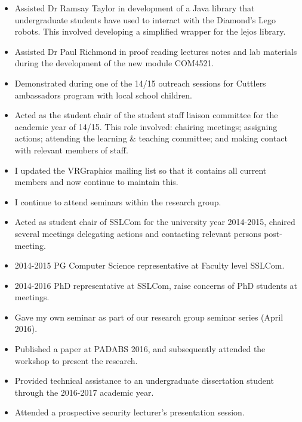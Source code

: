 \begin{itemize}
  \item Assisted Dr Ramsay Taylor in development of a Java library that undergraduate students have used to interact with the Diamond's Lego robots. This involved developing a simplified wrapper for the lejos library.
  \item Assisted Dr Paul Richmond in proof reading lectures notes and lab materials during the development of the new module COM4521.
  \item Demonstrated during one of the 14/15 outreach sessions for Cuttlers ambassadors program with local school children.
  \item Acted as the student chair of the student staff liaison committee for the academic year of 14/15. This role involved: chairing meetings; assigning actions; attending the learning \& teaching committee; and making contact with relevant members of staff.
  \item I updated the VRGraphics mailing list so that it contains all current members and now continue to maintain this.
  \item I continue to attend seminars within the research group.
  \item Acted as student chair of SSLCom for the university year 2014-2015, chaired several meetings delegating actions and contacting relevant persons post-meeting.
  \item 2014-2015 PG Computer Science representative at Faculty level SSLCom.
  \item 2014-2016 PhD representative at SSLCom, raise concerns of PhD students at meetings.
  \item Gave my own seminar as part of our research group seminar series (April 2016).
  \item Published a paper at PADABS 2016, and subsequently attended the workshop to present the research.
  \item Provided technical assistance to an undergraduate dissertation student through the 2016-2017 academic year.
  \item Attended a prospective security lecturer's presentation session.  
\end{itemize}